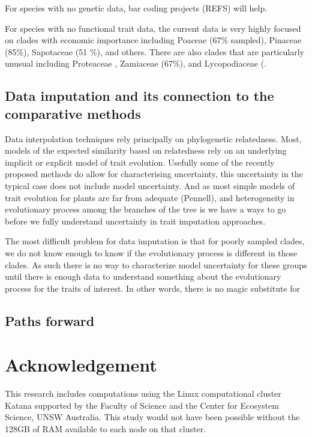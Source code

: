 \documentclass[a4paper,11pt]{article}
\begin{document}
For species with no genetic data, bar coding projects (REFS) will help.  

For species with no functional trait data, the current data is very highly focused on clades with economic importance including Poaceae (67\% sampled), Pinaceae (85\%), Sapotaceae (51 \%), and others.  There are also clades that are particularly unusual including Proteaceae \citep[73\% see][]{Cornwell}, Zamiaceae (67\%), and Lycopodiaceae (.  

\subsection{Data imputation and its connection to the comparative methods}

Data interpolation techniques rely principally on phylogenetic relatedness.  
Most, models of the expected similarity based on relatedness rely on an underlying implicit or explicit model of trait evolution.  
Usefully some of the recently proposed methods do allow for characterising uncertainty, this uncertainty in the typical case
does not include model uncertainty.  And as most simple models of trait evolution for plants are far from adequate (Pennell), and heterogeneity in evolutionary 
process among the branches of the tree is 
we have a ways to go before we fully understand uncertainty in trait imputation approaches.   

The most difficult problem for data imputation is that for poorly sampled clades, we do not know enough to know if the evolutionary process is different in those clades.  As such there is no way to characterize model uncertainty for these groups until there is enough data to understand something about the evolutionary process for the traits of interest.  In other words, there is no magic substitute for 


\subsection{Paths forward}



\section{Acknowledgement}

This research includes computations using the Linux computational cluster Katana supported by the Faculty of Science and the Center for Ecosystem Science, UNSW Australia.
This study would not have been possible without the 128GB of RAM available to each node on that cluster.  
\end{document}
